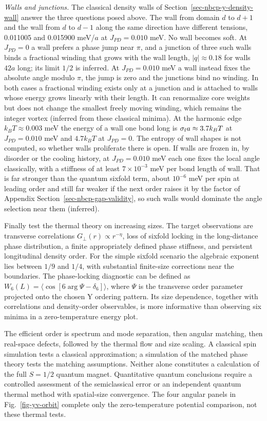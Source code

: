 \emph{Walls and junctions.} The classical density walls of
Section~\ref{sec-nbcp-y-density-wall} answer the three questions posed
above. The wall from domain \(d\) to \(d+1\) and the wall from \(d\) to
\(d-1\) along the same direction have different tensions, 0.011005 and
0.015900 meV/\(a\) at \(J_{PD}=0.010\) meV. No wall becomes soft. At
\(J_{PD}=0\) a wall prefers a phase jump near \(\pi\), and a junction
of three such walls binds a fractional winding that grows with the wall
length, \(|q|\approx0.18\) for walls \(42a\) long; its limit \(1/2\)
is inferred. At \(J_{PD}=0.010\) meV a wall instead fixes the absolute
angle modulo \(\pi\), the jump is zero and the junctions bind no
winding. In both cases a fractional winding exists only at a junction
and is attached to walls whose energy grows linearly with their length.
It can renormalize core weights but does not change the smallest freely
moving winding, which remains the integer vortex (inferred from these
classical minima). At the harmonic edge \(k_BT\approx0.003\) meV the
energy of a wall one bond long is \(\sigma_{\rm f}a\approx3.7k_BT\) at
\(J_{PD}=0.010\) meV and \(4.7k_BT\) at \(J_{PD}=0\). The entropy of
wall shapes is not computed, so whether walls proliferate there is open.
If walls are frozen in, by disorder or the cooling history, at
\(J_{PD}=0.010\) meV each one fixes the local angle classically, with a
stiffness of at least \(7\times10^{-3}\) meV per bond length of wall.
That is far stronger than the quantum sixfold term, about
\(10^{-6}\) meV per spin at leading order and still far weaker if the
next order raises it by the factor of Appendix
Section~\ref{sec-nbcp-gap-validity}, so such walls would dominate the
angle selection near them (inferred).

Finally test the thermal theory on increasing sizes. The target
observations are transverse correlations
\(G_\perp(r)\propto r^{-\eta}\), loss of sixfold locking in the
long-distance phase distribution, a finite appropriately defined phase
stiffness, and persistent longitudinal density order. For the simple
sixfold scenario the algebraic exponent lies between \(1/9\) and
\(1/4\), with substantial finite-size corrections near the boundaries.
The phase-locking diagnostic can be defined as
\(W_6(L)=\langle\cos[6\arg\Psi-\delta_6]\rangle\), where \(\Psi\) is the
transverse order parameter projected onto the chosen Y ordering pattern.
Its size dependence, together with correlations and density-order
observables, is more informative than observing six minima in a
zero-temperature energy plot.

The efficient order is spectrum and mode separation, then angular
matching, then real-space defects, followed by the thermal flow and size
scaling. A classical spin simulation tests a classical approximation; a
simulation of the matched phase theory tests the matching assumptions.
Neither alone constitutes a calculation of the full \(S=1/2\) quantum
magnet. Quantitative quantum conclusions require a controlled assessment
of the semiclassical error or an independent quantum thermal method with
spatial-size convergence. The four angular panels in
Fig.~\ref{fig-yv-orbit} complete only the zero-temperature potential
comparison, not these thermal tests.
